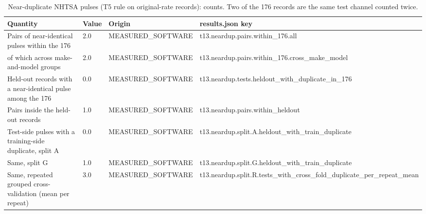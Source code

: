 \begin{table}[t]
\centering
\small
\caption{Near-duplicate NHTSA pulses (T5 rule on original-rate records): counts. Two of the 176 records are the same test channel counted twice.}
\label{tab:jp_tab_t13_neardup}
\begin{tabular}{llll}
\toprule
Quantity & Value & Origin & results.json key \\
\midrule
Pairs of near-identical pulses within the 176 & 2.0 & MEASURED\_SOFTWARE & t13.neardup.pairs.within\_176.all \\
of which across make-and-model groups & 2.0 & MEASURED\_SOFTWARE & t13.neardup.pairs.within\_176.cross\_make\_model \\
Held-out records with a near-identical pulse among the 176 & 0.0 & MEASURED\_SOFTWARE & t13.neardup.tests.heldout\_with\_duplicate\_in\_176 \\
Pairs inside the held-out records & 1.0 & MEASURED\_SOFTWARE & t13.neardup.pairs.within\_heldout \\
Test-side pulses with a training-side duplicate, split A & 0.0 & MEASURED\_SOFTWARE & t13.neardup.split.A.heldout\_with\_train\_duplicate \\
Same, split G & 1.0 & MEASURED\_SOFTWARE & t13.neardup.split.G.heldout\_with\_train\_duplicate \\
Same, repeated grouped cross-validation (mean per repeat) & 3.0 & MEASURED\_SOFTWARE & t13.neardup.split.R.tests\_with\_cross\_fold\_duplicate\_per\_repeat\_mean \\
\bottomrule
\end{tabular}
\end{table}
